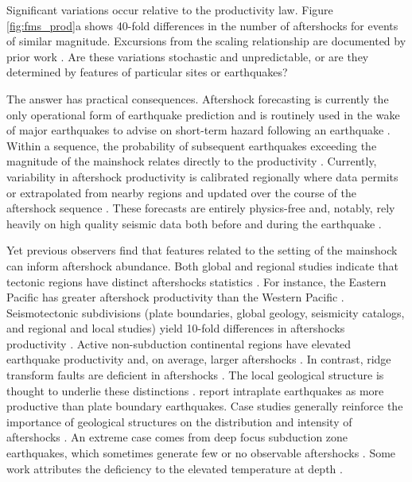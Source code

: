 \documentclass[draft]{agujournal2018}
\begin{document}
Significant variations occur relative to the productivity law. Figure \ref{fig:fms_prod}a shows 40-fold differences in the number of aftershocks for events of similar magnitude. Excursions from the scaling relationship are documented by prior work \citep[e.g.][]{Marsan2017HowAftershocks,Boettcher2004EarthquakeFaults,Page,Tahir2014Aftershock2005}. Are these variations stochastic and unpredictable, or are they determined by features of particular sites or earthquakes?

The answer has practical consequences. Aftershock forecasting is currently the only operational form of earthquake prediction and is routinely used in the wake of major earthquakes to advise on short-term hazard following an earthquake \citep{Reasenberg1989,Page}. Within a sequence, the probability of subsequent earthquakes exceeding the magnitude of the mainshock relates directly to the productivity \citep{Reasenberg1989, Reasenberg1999ForeshockEarthquakes}. Currently, variability in aftershock productivity is calibrated regionally where data permits or extrapolated from nearby regions and updated over the course of the aftershock sequence \citep[e.g.][]{Reasenberg1989, Reasenberg1999ForeshockEarthquakes, ogata2017statistics}. These forecasts are entirely physics-free and, notably, rely heavily on high quality seismic data both before and during the earthquake \citep{Gerstenberger2005Real-timeCalifornia, Omi2015Intermediate-termApproaches}.

Yet previous observers find that features related to the setting of the mainshock can inform aftershock abundance. Both global and regional studies indicate that tectonic regions have distinct aftershocks statistics \citep{Chu2011, Page, Davidsen2015GeneralizedCalifornia, Tahir2014Aftershock2005, ogata2017statistics}. For instance, the Eastern Pacific has greater aftershock productivity than the Western Pacific \citep{Singh1988Regionalle7.0, Wetzler2016}. Seismotectonic subdivisions (plate boundaries, global geology, seismicity catalogs, and regional and local studies) yield 10-fold differences in aftershocks productivity \citep{Page}. Active non-subduction continental regions have elevated earthquake productivity and, on average, larger aftershocks \citep{Page, Mogi1967, Davis1991Single-linkVariations}. In contrast, ridge transform faults are deficient in aftershocks \citep{Davis1991Single-linkVariations, Boettcher2004EarthquakeFaults, McGuire2005}. The local geological structure is thought to underlie these distinctions \citep{Boettcher2004EarthquakeFaults, McCloskey2003StructuralAftershocks}. \citet{Yamanaka1990scalingshock} report intraplate earthquakes as more productive than plate boundary earthquakes. Case studies generally reinforce the importance of geological structures on the distribution and intensity of aftershocks \citep{Das2003SpatialDistribution, McCloskey2003StructuralAftershocks}. An extreme case comes from deep focus subduction zone earthquakes, which sometimes generate few or no observable aftershocks \citep{Bath1965LateralMantle, Frohlich1989TheEarthquakes, Nyffenegger2000, Wiens1997AftershockZone, Wu1999, Houston2004}. Some work attributes the deficiency to the elevated temperature at depth \citep{Nyffenegger2000, Houston2004}. 
\end{document}
